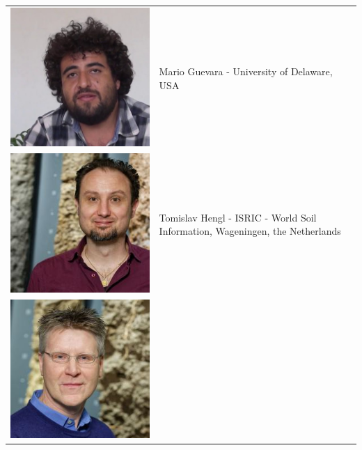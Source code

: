 \documentclass[10pt,b5paper,]{book}
\theoremstyle{definition}
\theoremstyle{definition}
\theoremstyle{definition}
\theoremstyle{remark}
\begin{document}
\begin{longtable}[]{@{}ll@{}}
\begin{minipage}[t]{0.13\columnwidth}
\includegraphics{contrAuthors/Guevara.jpg}\strut
\end{minipage} & \begin{minipage}[t]{0.81\columnwidth}\raggedright
Mario Guevara - University of Delaware, USA\strut
\end{minipage}\tabularnewline
\begin{minipage}[t]{0.13\columnwidth}\raggedright
\includegraphics{contrAuthors/Hengl.jpg}\strut
\end{minipage} & \begin{minipage}[t]{0.81\columnwidth}\raggedright
Tomislav Hengl - ISRIC - World Soil Information, Wageningen, the
Netherlands\strut
\end{minipage}\tabularnewline
\begin{minipage}[t]{0.13\columnwidth}\raggedright
\includegraphics{contrAuthors/Heuvelink.jpg}\strut

\end{minipage}
\end{longtable}
\end{document}
